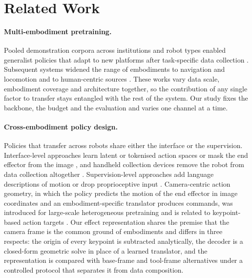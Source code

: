 \section{Related Work}
\label{sec:related}

\paragraph{Multi-embodiment pretraining.}
Pooled demonstration corpora across institutions and robot types \citep{oxe2023openx, khazatsky2024droid} enabled generalist policies that adapt to new platforms after task-specific data collection \citep{kim2024openvla, ghosh2024octo, black2024pi0, pi2025pi05}. Subsequent systems widened the range of embodiments to navigation and locomotion \citep{doshi2024crossformer, yang2024pushing} and to human-centric sources \citep{luo2026beingh05}. These works vary data scale, embodiment coverage and architecture together, so the contribution of any single factor to transfer stays entangled with the rest of the system. Our study fixes the backbone, the budget and the evaluation and varies one channel at a time.

\paragraph{Cross-embodiment policy design.}
Policies that transfer across robots share either the interface or the supervision. Interface-level approaches learn latent or tokenised action spaces \citep{mu2026onepolicy, zheng2025xvla} or mask the end effector from the image \citep{piseno2026cloak}, and handheld collection devices remove the robot from data collection altogether \citep{chi2024umi, liu2026rdt2}. Supervision-level approaches add language descriptions of motion \citep{zha2026lap} or drop proprioceptive input \citep{zhao2025proprio}. Camera-centric action geometry, in which the policy predicts the motion of the end effector in image coordinates and an embodiment-specific translator produces commands, was introduced for large-scale heterogeneous pretraining \citep{xiaomi2026ucagp} and is related to keypoint-based action targets \citep{xu2026actiongeometry}. Our effect representation shares the premise that the camera frame is the common ground of embodiments and differs in three respects: the origin of every keypoint is subtracted analytically, the decoder is a closed-form geometric solve in place of a learned translator, and the representation is compared with base-frame and tool-frame alternatives under a controlled protocol that separates it from data composition.

